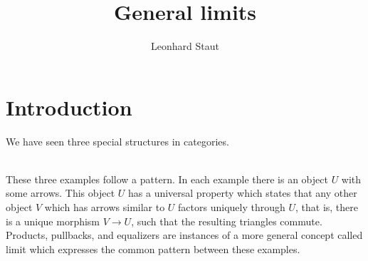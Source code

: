 \def\pathToRoot{../../}

\title{General limits}
\author{Leonhard Staut}




\maketitle
\chapter{Introduction}
We have seen three special structures in categories.\\[1em]
\begin{minipage}{.35\linewidth}
\end{minipage}%
\begin{minipage}{.35\linewidth}
\end{minipage}%
\begin{minipage}{.3\linewidth}
\end{minipage}\\[2em]
These three examples follow a pattern.
In each example there is an object $U$ with some arrows. This object $U$
has a universal property which states that any other object $V$ which has arrows
similar to $U$
factors uniquely through $U$, that is, there is a unique morphism $V \to U$,
such that the resulting triangles commute.\\
Products, pullbacks, and equalizers are instances of a more general concept called
limit which expresses the common pattern between these examples.

